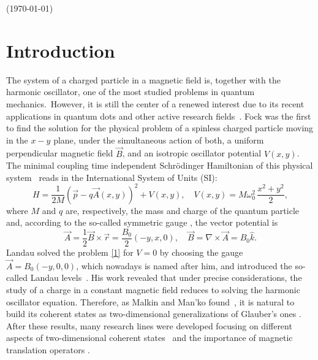 \documentclass[aps,showpacs,showkeys]{revtex4}
\begin{document}
\centerline{(\today)}


\section{Introduction}\label{sec1}
The system of a charged particle in a magnetic field is, together with the harmonic oscillator, one of the most studied problems in quantum mechanics.~However,  it is still the center of a renewed interest due to its recent applications in quantum dots and other active research fields~\cite{h93,kat01,mc94,cac07,spba04}. Fock was the first  to find the solution for the physical problem of a spinless charged particle moving in the $x-y$ plane, under the simultaneous action of both, a uniform perpendicular magnetic field $\vec{B}$, and an isotropic oscillator potential $V(x,y)$. The minimal coupling time independent Schr\"{o}dinger Hamiltonian of this physical system~\cite{f28,d31} reads in the International System of Units (SI):
\begin{equation}
	\label{1}
	H=\frac{1}{2M}\left(\vec{p}- {q}\vec{A}(x,y)\right)^2+V(x,y), \quad V(x,y)=M\omega_0^2\, \frac{x^2+y^2}{2},
\end{equation}
where $M$ and $q$ are, respectively, the mass and charge of the quantum particle and, according to the so-called symmetric gauge \cite{d31,p30}, the vector potential is 
\begin{equation}
	\label{2}
	\vec{A}=\frac12\vec{B}\times\vec{r}=\frac{B_0}{2}(-y,x,0), \quad \vec{B}=\nabla\times\vec{A}=B_0\hat{k}.
\end{equation} 
Landau solved the problem \eqref{1} for $V=0$ by choosing the gauge $\vec{A}=B_0(-y,0,0)$, which nowadays is named after him, and introduced the so-called Landau levels~\cite{landau30}. His work revealed that under precise considerations, the study of a charge in a constant magnetic field reduces to solving the harmonic oscillator equation. Therefore, as Malkin and Man'ko found~\cite{mm69}, it is natural to build its coherent states as two-dimensional generalizations of Glauber's ones \cite{g63}. After these results, many research lines were developed focusing on different aspects of two-dimensional coherent states~\cite{fk70,lms89,krp96,sm03,kr05,re08,d17} and the importance of magnetic translation operators \cite{z64,b64,l83,wz94,fw99}.
\end{document}
